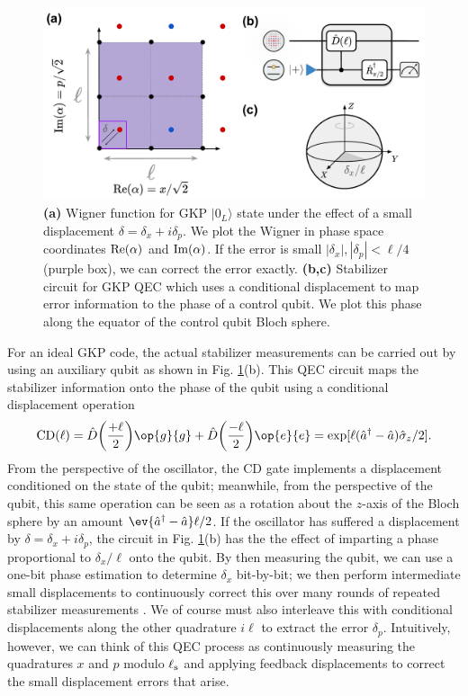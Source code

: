 \begin{figure}[h]
    \centering
    \includegraphics[width=0.85\linewidth]{Figures/2/GKP Ideal QEC.pdf}
    \caption[Schematic for ideal GKP error correction using phase estimation on an auxiliary qubit.]{\textbf{(a)} Wigner function for GKP $|0_L\rangle$ state under the effect of a small displacement $\delta = \delta_x + i\delta_p$. We plot the Wigner in phase space coordinates ${\rm Re}(\alpha)$ and ${\rm Im}(\alpha)$. If the error is small $|\delta_x|, |\delta_p| < \ell / 4$ (purple box), we can correct the error exactly. \textbf{(b,c)} Stabilizer circuit for GKP QEC which uses a conditional displacement to map error information to the phase of a control qubit. We plot this phase along the equator of the control qubit Bloch sphere.}
    \label{fig:2-GKP-Ideal-QEC}
\end{figure}

For an ideal GKP code, the actual stabilizer measurements can be carried out by using an auxiliary qubit as shown in Fig. \ref{fig:2-GKP-Ideal-QEC}(b). This QEC circuit maps the stabilizer information onto the phase of the qubit using a conditional displacement operation
\begin{equation}
    {\rm CD}(\ell) = \hat{D}\bigg(\frac{+\ell}{2}\bigg)\op{g}{g} + \hat{D}\bigg(\frac{-\ell}{2}\bigg)\op{e}{e} = \exp[\ell(\hat{a}^\dagger - \hat{a}) \sigmaz / 2].
    \label{eq:2_CD_unitary_definition}
\end{equation}
From the perspective of the oscillator, the CD gate implements a displacement conditioned on the state of the qubit; meanwhile, from the perspective of the qubit, this same operation can be seen as a rotation about the $z$-axis of the Bloch sphere by an amount $\ev{\hat{a}^\dagger - \hat{a}}\ell/2$. If the oscillator has suffered a displacement by $\delta = \delta_x + i\delta_p$, the circuit in Fig. \ref{fig:2-GKP-Ideal-QEC}(b) has the the effect of imparting a phase proportional to $\delta_x/\ell$ onto the qubit. By then measuring the qubit, we can use a one-bit phase estimation to determine $\delta_x$ bit-by-bit; we then perform intermediate small displacements to continuously correct this over many rounds of repeated stabilizer measurements \cite{terhal2016phase-estimation, terhal2020bosonic}. We of course must also interleave this with conditional displacements along the other quadrature $i\ell$ to extract the error $\delta_p$. Intuitively, however, we can think of this QEC process as continuously measuring the quadratures $x$ and $p$ modulo $\ell_{\rm s}$ and applying feedback displacements to correct the small displacement errors that arise. 

